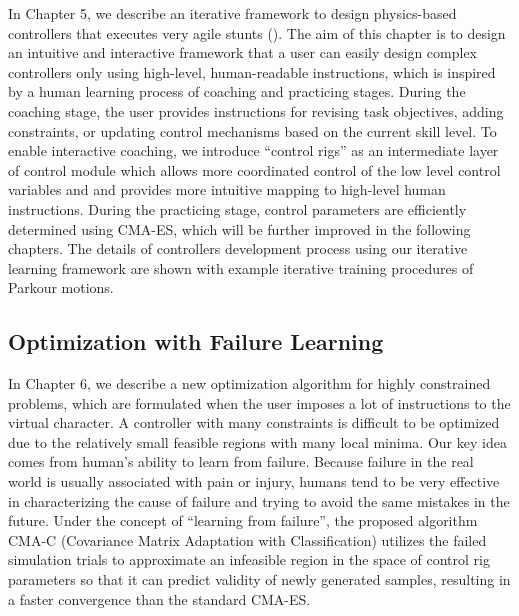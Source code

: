In Chapter 5, we describe an iterative framework to design physics-based
controllers that executes very agile stunts ().
The aim of this chapter is to design an intuitive and interactive framework
that a user can easily design complex controllers only using high-level,
human-readable instructions, 
which is inspired by a human learning process of coaching and practicing stages.
During the coaching stage, the user provides instructions for revising
task objectives, adding constraints, or updating control mechanisms based
on the current skill level.
To enable interactive coaching, we introduce ``control rigs'' as
an intermediate layer of control module which allows more coordinated control
of the low level control variables and and provides more intuitive mapping to
high-level human instructions. 
During the practicing stage, control parameters are efficiently determined
using CMA-ES, which will be further improved in the following chapters.
The details of controllers development process using our iterative learning
framework are shown with example iterative training procedures of Parkour
motions.

\subsection{Optimization with Failure Learning}
In Chapter 6, we describe a new optimization algorithm for
highly constrained problems, which are formulated when the user
imposes a lot of instructions to the virtual character.
A controller with many constraints is difficult to be optimized due to the
relatively small feasible regions with many local minima.
Our key idea comes from human’s ability to learn from failure. 
Because failure in the real world is usually associated with pain or injury,
humans tend to be very effective in characterizing the cause of failure and
trying to avoid the same mistakes in the future. 
Under the concept of ``learning from failure'', the proposed algorithm CMA-C
(Covariance Matrix Adaptation with Classification) utilizes the failed
simulation trials to approximate an infeasible region in the space of control
rig parameters so that it can predict validity of newly generated samples,
resulting in a faster convergence than the standard CMA-ES.

